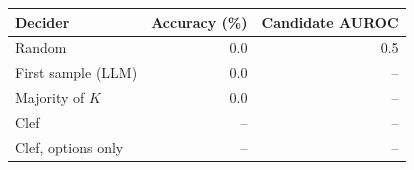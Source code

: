 \begin{tabular}{lrr}
\toprule
Decider & Accuracy (\%) & Candidate AUROC \\
\midrule
Random & 0.0 & 0.5 \\
First sample (\textsc{LLM}) & 0.0 & -- \\
Majority of $K$ & 0.0 & -- \\
Clef & -- & -- \\
Clef, options only & -- & -- \\
\bottomrule
\end{tabular}
